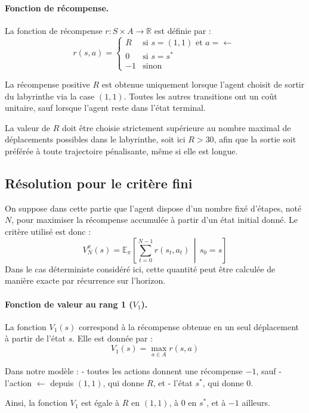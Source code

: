 \documentclass[12pt]{article}
\begin{document}
\paragraph{Fonction de récompense.}
La fonction de récompense \(r : S \times A \to \mathbb{R}\) est définie par :
\[
r(s,a) =
\begin{cases}
R & \text{si } s = (1,1) \text{ et } a = \leftarrow \\
0 & \text{si } s = s^* \\
-1 & \text{sinon}
\end{cases}
\]

La récompense positive \(R\) est obtenue uniquement lorsque l’agent choisit de sortir du labyrinthe via la case \((1,1)\). Toutes les autres transitions ont un coût unitaire, sauf lorsque l’agent reste dans l’état terminal.

La valeur de \(R\) doit être choisie strictement supérieure au nombre maximal de déplacements possibles dans le labyrinthe, soit ici \(R > 30\), afin que la sortie soit préférée à toute trajectoire pénalisante, même si elle est longue.

\subsection{Résolution pour le critère fini}

On suppose dans cette partie que l’agent dispose d’un nombre fixé d’étapes, noté \(N\), pour maximiser la récompense accumulée à partir d’un état initial donné. Le critère utilisé est donc :
\[
V^\pi_N(s) = \mathbb{E}_\pi \left[ \sum_{t=0}^{N-1} r(s_t, a_t) \,\middle|\, s_0 = s \right]
\]
Dans le cas déterministe considéré ici, cette quantité peut être calculée de manière exacte par récurrence sur l’horizon.

\paragraph{Fonction de valeur au rang 1 (\(V_1\)).}

La fonction \(V_1(s)\) correspond à la récompense obtenue en un seul déplacement à partir de l’état \(s\). Elle est donnée par :
\[
V_1(s) = \max_{a \in A} r(s,a)
\]

Dans notre modèle :
- toutes les actions donnent une récompense \(-1\), sauf
- l’action \(\leftarrow\) depuis \((1,1)\), qui donne \(R\), et
- l’état \(s^*\), qui donne 0.

Ainsi, la fonction \(V_1\) est égale à \(R\) en \((1,1)\), à 0 en \(s^*\), et à \(-1\) ailleurs.
\end{document}
